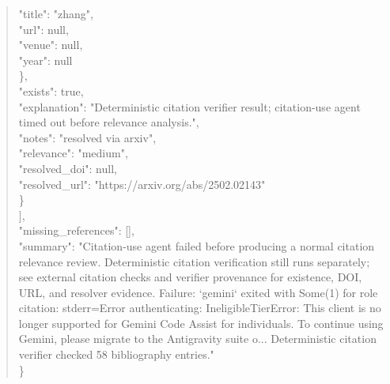 \documentclass[11pt]{article}
\begin{document}
\begin{quote}
        "title": "zhang",\\
        "url": null,\\
        "venue": null,\\
        "year": null\\
      \},\\
      "exists": true,\\
      "explanation": "Deterministic citation verifier result; citation-use agent timed out before relevance analysis.",\\
      "notes": "resolved via arxiv",\\
      "relevance": "medium",\\
      "resolved\_doi": null,\\
      "resolved\_url": "https://arxiv.org/abs/2502.02143"\\
    \}\\
  ],\\
  "missing\_references": [],\\
  "summary": "Citation-use agent failed before producing a normal citation relevance review. Deterministic citation verification still runs separately; see external citation checks and verifier provenance for existence, DOI, URL, and resolver evidence. Failure: `gemini` exited with Some(1) for role citation: stderr=Error authenticating: IneligibleTierError: This client is no longer supported for Gemini Code Assist for individuals. To continue using Gemini, please migrate to the Antigravity suite o... Deterministic citation verifier checked 58 bibliography entries."\\
\}\\
\end{quote}
\end{document}
